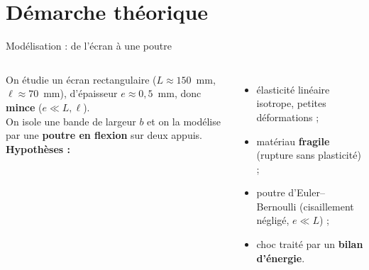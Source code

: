 \documentclass[11pt,aspectratio=169]{beamer}
\begin{document}
\section{Démarche théorique}

\begin{frame}{Modélisation : de l'écran à une poutre}
  \begin{columns}[c]
    \centering
    \footnotesize
    On étudie un écran rectangulaire ($L\approx 150$~mm, $\ell\approx 70$~mm),
    d'épaisseur $e\approx 0{,}5$~mm, donc \textbf{mince} ($e\ll L,\ell$).
    \medskip\\
    On isole une bande de largeur $b$ et on la modélise par une \textbf{poutre
    en flexion} sur deux appuis.
    \medskip\\
    \textbf{Hypothèses :}
    \begin{itemize}\itemsep1pt
      \item élasticité linéaire isotrope, petites déformations ;
      \item matériau \textbf{fragile} (rupture sans plasticité) ;
      \item poutre d'Euler--Bernoulli (cisaillement négligé, $e\ll L$) ;
      \item choc traité par un \textbf{bilan d'énergie}.
    \end{itemize}
  \end{columns}
\end{frame}
\end{document}
